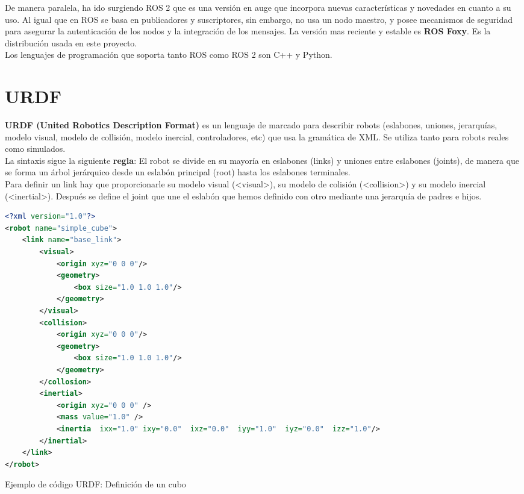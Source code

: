 De manera paralela, ha ido surgiendo ROS 2 que es una versión en auge que incorpora nuevas características y novedades en cuanto a su uso. Al igual que en ROS se basa en publicadores y suscriptores, sin embargo, no usa un nodo maestro, y posee mecanismos de seguridad para asegurar la autenticación de los nodos y la integración de los mensajes. La versión mas reciente y estable es \textbf{ROS Foxy}. Es la distribución usada en este proyecto.\\

Los lenguajes de programación que soporta tanto ROS como ROS 2 son C++ y Python.\\

\section{URDF}
\label{sec:urdf}

\textbf{URDF (United Robotics Description Format)} es un lenguaje de marcado para describir robots (eslabones, uniones, jerarquías, modelo visual, modelo de collisión, modelo inercial, controladores, etc) que usa la gramática de XML. Se utiliza tanto para robots reales como simulados.\\

La sintaxis sigue la siguiente \textbf{regla}: El robot se divide en su mayoría en eslabones (links) y uniones entre eslabones (joints), de manera que se forma un árbol jerárquico desde un eslabón principal (root) hasta los eslabones terminales.\\

Para definir un link hay que proporcionarle su modelo visual (<visual>), su modelo de colisión (<collision>) y su modelo inercial (<inertial>). Después se define el joint que une el eslabón que hemos definido con otro mediante una jerarquía de padres e hijos.\\

\begin{code}[H]
\begin{lstlisting}[language=XML]
<?xml version="1.0"?>
<robot name="simple_cube">
	<link name="base_link">
		<visual>
			<origin xyz="0 0 0"/>
			<geometry>
				<box size="1.0 1.0 1.0"/>
			</geometry>
		</visual>
		<collision>
			<origin xyz="0 0 0"/>
			<geometry>
				<box size="1.0 1.0 1.0"/>
			</geometry>
		</collosion>
		<inertial>
			<origin xyz="0 0 0" /> 
			<mass value="1.0" />
			<inertia  ixx="1.0" ixy="0.0"  ixz="0.0"  iyy="1.0"  iyz="0.0"  izz="1.0"/>
		</inertial>
	</link>
</robot>
\end{lstlisting}
\caption[Ejemplo de código URDF: Definición de un cubo]{Ejemplo de código URDF: Definición de un cubo}
\label{cod:codigo_urdf}
\end{code}

